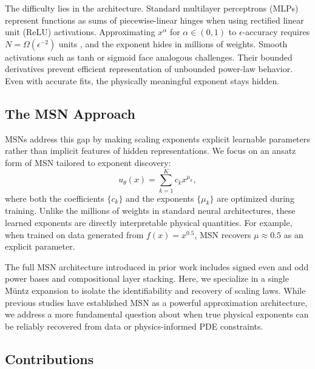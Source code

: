 \documentclass{article}
\theoremstyle{plain}
\theoremstyle{definition}
\theoremstyle{remark}
\begin{document}
The difficulty lies in the architecture. Standard multilayer perceptrons (MLPs) represent functions as sums of piecewise-linear hinges when using rectified linear unit (ReLU) activations. Approximating $x^\alpha$ for $\alpha \in (0,1)$ to $\epsilon$-accuracy requires $N = \Omega(\epsilon^{-2})$ units \cite{nguessan2025msn}, and the exponent hides in millions of weights. Smooth activations such as tanh or sigmoid face analogous challenges. Their bounded derivatives prevent efficient representation of unbounded power-law behavior. Even with accurate fits, the physically meaningful exponent stays hidden.

\subsection{The MSN Approach}

MSNs \cite{nguessan2025msn} address this gap by making scaling exponents explicit learnable parameters rather than implicit features of hidden representations. We focus on an ansatz form of MSN tailored to exponent discovery:
\begin{equation}
	u_\theta(x) = \sum_{k=1}^{K} c_k x^{\mu_k},
	\label{eq:msn_intro}
\end{equation}
where both the coefficients $\{c_k\}$ and the exponents $\{\mu_k\}$ are optimized during training. Unlike the millions of weights in standard neural architectures, these learned exponents are directly interpretable physical quantities. For example, when trained on data generated from $f(x)=x^{0.5}$, MSN recovers $\mu \approx 0.5$ as an explicit parameter.

The full MSN architecture introduced in prior work includes signed even and odd power bases and compositional layer stacking. Here, we specialize in a single M\"untz expansion to isolate the identifiability and recovery of scaling laws. While previous studies have established MSN as a powerful approximation architecture, we address a more fundamental question about when true physical exponents can be reliably recovered from data or physics-informed PDE constraints.

\subsection{Contributions}
\end{document}
